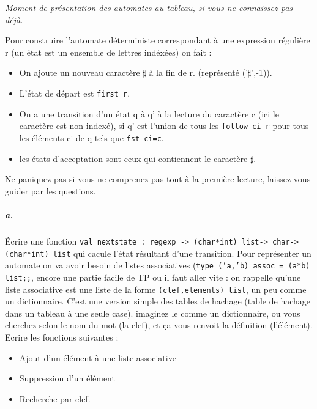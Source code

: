 \documentclass[10pt,a4paper]{article}
\begin{document}
\hrulefill

\emph{Moment de présentation des automates au tableau, si vous ne connaissez pas
déjà.}

\hrulefill

Pour construire l'automate déterministe correspondant à une expression
régulière r (un état est un ensemble de lettres indéxées) on fait :
\begin{itemize}
\item On ajoute un nouveau caractère $\sharp$ à la fin de r. (représenté
('$\sharp$',-1)).
\item L'état de départ est \texttt{first r}.
\item On a une transition d'un état q à q' à la lecture du caractère c (ici le
caractère est non indexé), si q' est l'union de tous les \texttt{follow ci r}
pour tous les éléments ci de q tels que \texttt{fst ci=c}.
\item les états d'acceptation sont ceux qui contiennent le caractère $\sharp$.
\end{itemize}
Ne paniquez pas si vous ne comprenez pas tout à la première lecture, laissez
vous guider par les questions.

\subparagraph{a.} Écrire une fonction \texttt{val nextstate : regexp ->
(char*int) list-> char-> (char*int) list} qui cacule l'état résultant d'une
transition.
Pour représenter un automate on va avoir besoin de listes associatives
(\texttt{type ('a,'b) assoc = (a*b) list;;}, encore
une partie facile de TP ou il faut aller vite : on rappelle qu'une liste
associative est une liste de la forme \texttt{(clef,elements) list}, un peu
comme un dictionnaire. C'est une version simple des tables de hachage (table de
hachage dans un tableau à une seule case). imaginez le comme un dictionnaire, ou
vous cherchez selon le nom du mot (la clef), et ça vous renvoit la définition
(l'élément). Ecrire les fonctions
suivantes : 
\begin{itemize}
\item Ajout d'un élément à une liste associative
\item Suppression d'un élément 
\item Recherche par clef.
\end{itemize}
 
\end{document}
